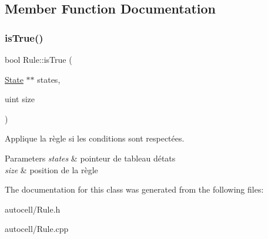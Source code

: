 \subsection{Member Function Documentation}
\mbox{\label{class_rule_af2ee35d50c019724a8de58c1b65586ec}} 
\subsubsection{\texorpdfstring{is\+True()}{isTrue()}}
{\footnotesize\ttfamily bool Rule\+::is\+True (\begin{DoxyParamCaption}\item[{\mbox{\hyperlink{class_state}{State}} $\ast$$\ast$}]{states,  }\item[{uint}]{size }\end{DoxyParamCaption})}



Applique la règle si les conditions sont respectées. 


\begin{DoxyParams}{Parameters}
{\em states} & pointeur de tableau d\textquotesingle{}états \\
\hline
{\em size} & position de la règle \\
\hline
\end{DoxyParams}


The documentation for this class was generated from the following files\+:\begin{DoxyCompactItemize}
\item 
autocell/Rule.\+h\item 
autocell/Rule.\+cpp\end{DoxyCompactItemize}

